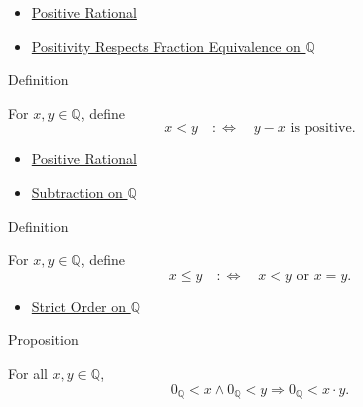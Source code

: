 \begin{dependencies}
\begin{itemize}
  \item \hyperref[def:positive-rational]{Positive Rational}
  \item \hyperref[lem:positivity-respects-equivalence-q]{Positivity Respects Fraction Equivalence on $\mathbb{Q}$}
\end{itemize}
\end{dependencies}

\begin{definitionbox}{Definition}
\begin{definition}
\label{def:strict-order-on-q}
For $x,y\in\mathbb{Q}$, define
\[
x<y \quad:\Longleftrightarrow\quad y-x \text{ is positive}.
\]
\end{definition}
\end{definitionbox}

\begin{dependencies}
\begin{itemize}
  \item \hyperref[def:positive-rational]{Positive Rational}
  \item \hyperref[def:subtraction-on-q]{Subtraction on $\mathbb{Q}$}
\end{itemize}
\end{dependencies}

\begin{definitionbox}{Definition}
\begin{definition}
\label{def:order-on-q}
For $x,y\in\mathbb{Q}$, define
\[
x\le y \quad:\Longleftrightarrow\quad x<y \text{ or } x=y.
\]
\end{definition}
\end{definitionbox}

\begin{dependencies}
\begin{itemize}
  \item \hyperref[def:strict-order-on-q]{Strict Order on $\mathbb{Q}$}
\end{itemize}
\end{dependencies}

\begin{propositionbox}{Proposition}
\begin{proposition}
\label{prop:product-of-positives-is-positive-q}
For all $x,y\in\mathbb{Q}$,
\[
0_{\mathbb{Q}}<x\land 0_{\mathbb{Q}}<y
\Longrightarrow
0_{\mathbb{Q}}<x\cdot y.
\]
\end{proposition}
\end{propositionbox}

